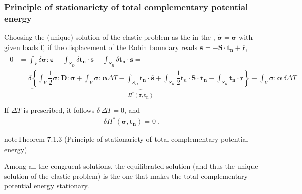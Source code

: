 \documentclass[letterpaper,10pt,english]{jupyterBook}
\begin{document}
\subsubsection{Principle of stationariety of total complementary potential energy}
\label{\detokenize{ch/solids/small-displacements-statics-weak-form-3d:principle-of-stationariety-of-total-complementary-potential-energy}}\label{\detokenize{ch/solids/small-displacements-statics-weak-form-3d:solid-mechanics-intro-small-displacements-statics-weak-form-weak-stationariety-potential-complementary}}
\sphinxAtStartPar
Choosing the (unique) solution of the elastic problem as the  in the {\hyperref[\detokenize{ch/solids/small-displacements-statics-weak-form-3d:solid-mechanics-intro-small-displacements-statics-weak-form-weak-pcvw}]{}}, \(\widetilde{\boldsymbol{\sigma}} = \boldsymbol\sigma\) with given loads \(\widetilde{\mathbf{f}}\), if the displacement of the Robin boundary reads \(\mathbf{s} = - \mathbf{S} \cdot \mathbf{t}_{\mathbf{n}} + \overline{\mathbf{r}}\),
\begin{equation*}
\begin{split}\begin{aligned}
0 & = \int_{V} \delta \boldsymbol\sigma : \boldsymbol\varepsilon - \int_{S_D} \delta \mathbf{t}_{\mathbf{n}} \cdot \overline{\mathbf{s}} - \int_{S_R} \delta \mathbf{t}_{\mathbf{n}} \cdot \mathbf{s} = \\
  & = \delta \underbrace{ \left\{ \int_V \dfrac{1}{2} \boldsymbol\sigma : \mathbf{D} : \boldsymbol\sigma + \int_{V} \boldsymbol\sigma : \boldsymbol\alpha \Delta T - \int_{S_D} \mathbf{t}_{\mathbf{n}} \cdot \overline{\mathbf{s}} + \int_{S_R} \dfrac{1}{2} \mathbf{t}_n \cdot \mathbf{S} \cdot \mathbf{t}_{\mathbf{n}} - \int_{S_R} \mathbf{t}_{\mathbf{n}} \cdot \overline{\mathbf{r}} \right\} }_{\Pi^*(\boldsymbol\sigma, \mathbf{t}_{\mathbf{n}})} - \int_V \boldsymbol\sigma : \boldsymbol\alpha \, \delta \Delta T \\
\end{aligned}\end{split}
\end{equation*}
\sphinxAtStartPar
If \(\Delta T\) is prescribed, it follows \(\delta \, \Delta T = 0\), and
\begin{equation*}
\begin{split}\delta \Pi^*(\boldsymbol\sigma, \mathbf{t}_{\mathbf{n}}) = 0 \ .\end{split}
\end{equation*}\label{ch/solids/small-displacements-statics-weak-form-3d:theorem-2}
\begin{sphinxadmonition}{note}{Theorem 7.1.3 (Principle of stationariety of total complementary potential energy)}



\sphinxAtStartPar
Among all the congruent solutions, the equilibrated solution (and thus the unique solution of the elastic problem) is the one that makes the total complementary potential energy stationary.
\end{sphinxadmonition}
\end{document}

